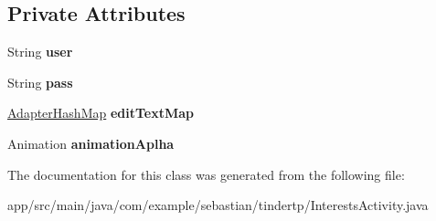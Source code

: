 \subsection*{Private Attributes}
\begin{DoxyCompactItemize}
\item 
String {\bfseries user}\hypertarget{classcom_1_1example_1_1sebastian_1_1tindertp_1_1InterestsActivity_a4b9e3de55072bf24ba28302a8eab7eee}{}\label{classcom_1_1example_1_1sebastian_1_1tindertp_1_1InterestsActivity_a4b9e3de55072bf24ba28302a8eab7eee}

\item 
String {\bfseries pass}\hypertarget{classcom_1_1example_1_1sebastian_1_1tindertp_1_1InterestsActivity_ac31469a6aad4e9dc8ab53778b1f4739d}{}\label{classcom_1_1example_1_1sebastian_1_1tindertp_1_1InterestsActivity_ac31469a6aad4e9dc8ab53778b1f4739d}

\item 
\hyperlink{classcom_1_1example_1_1sebastian_1_1tindertp_1_1commonTools_1_1AdapterHashMap}{Adapter\+Hash\+Map} {\bfseries edit\+Text\+Map}\hypertarget{classcom_1_1example_1_1sebastian_1_1tindertp_1_1InterestsActivity_ac3b0606956c0cbd2d73f9ea92d03b8b1}{}\label{classcom_1_1example_1_1sebastian_1_1tindertp_1_1InterestsActivity_ac3b0606956c0cbd2d73f9ea92d03b8b1}

\item 
Animation {\bfseries animation\+Aplha}\hypertarget{classcom_1_1example_1_1sebastian_1_1tindertp_1_1InterestsActivity_a5d6fd2a07c55e5236228f803d048e1f6}{}\label{classcom_1_1example_1_1sebastian_1_1tindertp_1_1InterestsActivity_a5d6fd2a07c55e5236228f803d048e1f6}

\end{DoxyCompactItemize}


The documentation for this class was generated from the following file\+:\begin{DoxyCompactItemize}
\item 
app/src/main/java/com/example/sebastian/tindertp/Interests\+Activity.\+java\end{DoxyCompactItemize}
